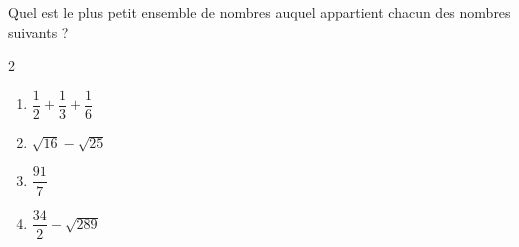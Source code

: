 \begin{exo}{}
	Quel est le plus petit ensemble de nombres auquel appartient chacun des nombres suivants ?
	\vspace*{-2mm}
	\begin{multicols}{2}
		\begin{enumerate}
			\item $\dfrac{1}{2} + \dfrac{1}{3} + \dfrac{1}{6}$
			\item $\sqrt{16} - \sqrt{25}$
			\item $\dfrac{91}{7}$
			\item $\dfrac{34}{2} - \sqrt{289}$
		\end{enumerate}
	\end{multicols}\vspace*{-2mm}
\end{exo}
